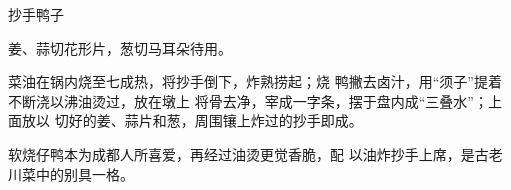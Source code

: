 \begin{recipe}{抄手鸭子}

\ingredients


\cooking

\step 姜、蒜切花形片，葱切马耳朵待用。

\step 菜油在锅内烧至七成热，将抄手倒下，炸熟捞起；烧 鸭撇去卤汁，用“须子”提着不断浇以沸油烫过，放在墩上 将骨去净，宰成一字条，摆于盘内成“三叠水”；上面放以 切好的姜、蒜片和葱，周围镶上炸过的抄手即成。

\notes

软烧仔鸭本为成都人所喜爱，再经过油烫更觉香脆，配 以油炸抄手上席，是古老川菜中的别具一格。

\end{recipe}

